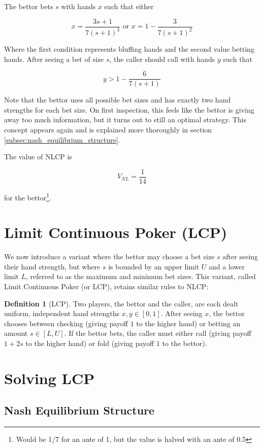\documentclass[a4paper,12pt]{article}
\theoremstyle{plain}
\theoremstyle{definition}
\newtheorem{definition}{Definition}[section]
\begin{document}
The bettor bets $s$ with hands $x$ such that either

$$ x = \frac{3 s+1}{7 (s+1)^3} \text{ or } x = 1 - \frac{3}{7 (s+1)^2} $$

Where the first condition represents bluffing hands and the second value betting hands. After seeing a bet of size $s$, the caller should call with hands $y$ such that

$$ y > 1 - \frac{6}{7 (s+1)} $$

Note that the bettor uses all possible bet sizes and has exactly two hand strengths for each bet size. On first inspection, this feels like the bettor is giving away too much information, but it turns out to still an optimal strategy. This concept appears again and is explained more thoroughly in section \ref{subsec:nash_equilibrium_structure}.

The value of NLCP is

$$ V_{NL} = \frac{1}{14} $$

for the bettor\footnote{Would be 1/7 for an ante of 1, but the value is halved with an ante of 0.5}.

\section{Limit Continuous Poker (LCP)}
We now introduce a variant where the bettor may choose a bet size $s$ after seeing their hand strength, but where $s$ is bounded by an upper limit $U$ and a lower limit $L$, referred to as the maximum and minimum bet sizes. This variant, called Limit Continuous Poker (or LCP), retains similar rules to NLCP: 

\begin{definition}[LCP]
Two players, the bettor and the caller, are each dealt uniform, independent hand strengths $x, y \in [0, 1]$. After seeing $x$, the bettor chooses between checking (giving payoff $1$ to the higher hand) or betting an amount $s \in [L, U]$. If the bettor bets, the caller must either call (giving payoff $1+2s$ to the higher hand) or fold (giving payoff $1$ to the bettor).
\end{definition}


\section{Solving LCP}

\subsection{Nash Equilibrium Structure}
\end{document}
